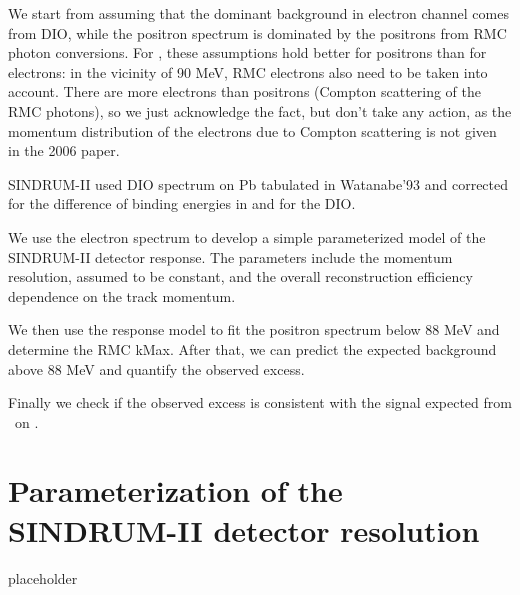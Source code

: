 \documentclass[12pt]{article}
\begin{document}
We start from assuming that the dominant background in electron channel comes from DIO,
while the positron spectrum is dominated by the positrons from RMC photon conversions.
For , these assumptions hold better for positrons than for electrons:
in the vicinity of 90 MeV, RMC electrons also need to be taken into account.
There are more electrons than positrons (Compton scattering of the RMC photons),
so we just acknowledge the fact, but don't take any action, as the momentum distribution
of the electrons due to Compton scattering is not given in the 2006 paper.

SINDRUM-II used DIO spectrum on Pb tabulated in Watanabe'93 and corrected for the
difference of binding energies in  and  for the DIO.

We use the electron spectrum to develop a simple parameterized model of
the SINDRUM-II detector response. The parameters include the momentum resolution,
assumed to be constant, and the overall reconstruction efficiency dependence on the 
track momentum.

We then use the response model to fit the positron spectrum below 88 MeV and
determine the RMC kMax. After that, we can predict the expected background
above 88 MeV and quantify the observed excess.

Finally we check if the observed excess is consistent with the signal expected from
\mumepconv\ on .

\newpage
\section {Parameterization of the SINDRUM-II detector resolution}

placeholder
\end{document}
